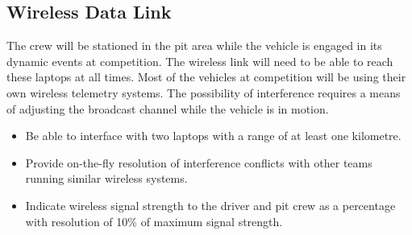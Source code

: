 \subsection{Wireless Data Link \label{sec:goals_telemetry_range}}

The crew will be stationed in the pit area while the vehicle is engaged in its dynamic events at competition. The wireless link will need to be able to reach these laptops at all times. Most of the vehicles at competition will be using their own wireless telemetry systems. The possibility of interference requires a means of adjusting the broadcast channel while the vehicle is in motion. 

\begin{itemize}

\item Be able to interface with two laptops with a range of at least one kilometre.
\item Provide on-the-fly resolution of interference conflicts with other teams running similar wireless systems.
\item Indicate wireless signal strength to the driver and pit crew as a percentage with resolution of 10\% of maximum signal
strength. 

\end{itemize}
